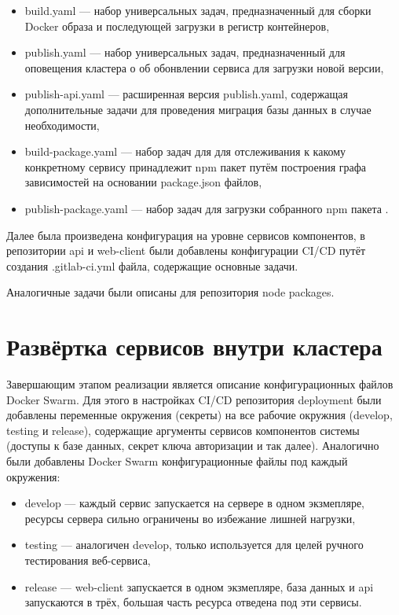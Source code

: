 \begin{itemize}
    \item build.yaml --- набор универсальных задач, предназначенный для сборки Docker образа и последующей загрузки в  регистр контейнеров,
    \item publish.yaml --- набор универсальных задач, предназначенный для оповещения кластера о об обонвлении сервиса для загрузки новой версии,
    \item publish-api.yaml --- расширенная версия publish.yaml, содержащая дополнительные задачи для проведения миграция базы данных в случае необходимости,
    \item build-package.yaml --- набор задач для для отслеживания к какому конкретному сервису принадлежит npm пакет путём построения графа зависимостей на основании package.json файлов,
    \item publish-package.yaml --- набор задач для загрузки собранного npm пакета .
\end{itemize}

Далее была произведена конфигурация на уровне сервисов компонентов, в репозитории api и web-client были добавлены конфигурации CI/CD путёт создания .gitlab-ci.yml файла, содержащие основные задачи.

Аналогичные задачи были описаны для репозитория node packages.

\section{Развёртка сервисов внутри кластера}

Завершающим этапом реализации является описание конфигурационных файлов Docker Swarm.
Для этого в настройках CI/CD репозитория deployment были добавлены переменные окружения (секреты) на все рабочие окружния (develop, testing и release),
содержащие аргументы сервисов компонентов системы (доступы к базе данных, секрет ключа авторизации и так далее).
Аналогично были добавлены Docker Swarm конфигурационные файлы под каждый окружения:

\begin{itemize}
    \item develop --- каждый сервис запускается на сервере в одном экзмепляре, ресурсы сервера сильно ограничены во избежание лишней нагрузки,
    \item testing --- аналогичен develop, только используется для целей ручного тестирования веб-сервиса,
    \item release --- web-client запускается в одном экзмепляре, база данных и api запускаются в трёх, большая часть ресурса отведена под эти сервисы.
\end{itemize}

\cite{kuberForDevOps}


